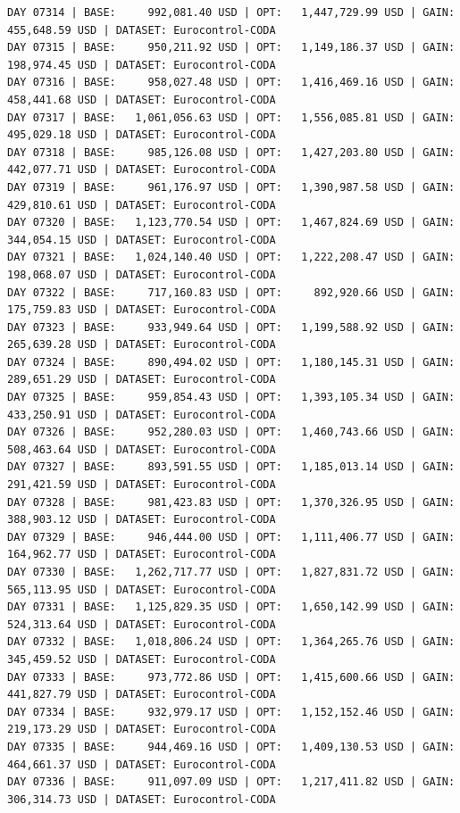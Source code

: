 \documentclass[11pt,a4paper]{article}
\begin{document}
\begin{verbatim}
DAY 07314 | BASE:     992,081.40 USD | OPT:   1,447,729.99 USD | GAIN: 455,648.59 USD | DATASET: Eurocontrol-CODA
DAY 07315 | BASE:     950,211.92 USD | OPT:   1,149,186.37 USD | GAIN: 198,974.45 USD | DATASET: Eurocontrol-CODA
DAY 07316 | BASE:     958,027.48 USD | OPT:   1,416,469.16 USD | GAIN: 458,441.68 USD | DATASET: Eurocontrol-CODA
DAY 07317 | BASE:   1,061,056.63 USD | OPT:   1,556,085.81 USD | GAIN: 495,029.18 USD | DATASET: Eurocontrol-CODA
DAY 07318 | BASE:     985,126.08 USD | OPT:   1,427,203.80 USD | GAIN: 442,077.71 USD | DATASET: Eurocontrol-CODA
DAY 07319 | BASE:     961,176.97 USD | OPT:   1,390,987.58 USD | GAIN: 429,810.61 USD | DATASET: Eurocontrol-CODA
DAY 07320 | BASE:   1,123,770.54 USD | OPT:   1,467,824.69 USD | GAIN: 344,054.15 USD | DATASET: Eurocontrol-CODA
DAY 07321 | BASE:   1,024,140.40 USD | OPT:   1,222,208.47 USD | GAIN: 198,068.07 USD | DATASET: Eurocontrol-CODA
DAY 07322 | BASE:     717,160.83 USD | OPT:     892,920.66 USD | GAIN: 175,759.83 USD | DATASET: Eurocontrol-CODA
DAY 07323 | BASE:     933,949.64 USD | OPT:   1,199,588.92 USD | GAIN: 265,639.28 USD | DATASET: Eurocontrol-CODA
DAY 07324 | BASE:     890,494.02 USD | OPT:   1,180,145.31 USD | GAIN: 289,651.29 USD | DATASET: Eurocontrol-CODA
DAY 07325 | BASE:     959,854.43 USD | OPT:   1,393,105.34 USD | GAIN: 433,250.91 USD | DATASET: Eurocontrol-CODA
DAY 07326 | BASE:     952,280.03 USD | OPT:   1,460,743.66 USD | GAIN: 508,463.64 USD | DATASET: Eurocontrol-CODA
DAY 07327 | BASE:     893,591.55 USD | OPT:   1,185,013.14 USD | GAIN: 291,421.59 USD | DATASET: Eurocontrol-CODA
DAY 07328 | BASE:     981,423.83 USD | OPT:   1,370,326.95 USD | GAIN: 388,903.12 USD | DATASET: Eurocontrol-CODA
DAY 07329 | BASE:     946,444.00 USD | OPT:   1,111,406.77 USD | GAIN: 164,962.77 USD | DATASET: Eurocontrol-CODA
DAY 07330 | BASE:   1,262,717.77 USD | OPT:   1,827,831.72 USD | GAIN: 565,113.95 USD | DATASET: Eurocontrol-CODA
DAY 07331 | BASE:   1,125,829.35 USD | OPT:   1,650,142.99 USD | GAIN: 524,313.64 USD | DATASET: Eurocontrol-CODA
DAY 07332 | BASE:   1,018,806.24 USD | OPT:   1,364,265.76 USD | GAIN: 345,459.52 USD | DATASET: Eurocontrol-CODA
DAY 07333 | BASE:     973,772.86 USD | OPT:   1,415,600.66 USD | GAIN: 441,827.79 USD | DATASET: Eurocontrol-CODA
DAY 07334 | BASE:     932,979.17 USD | OPT:   1,152,152.46 USD | GAIN: 219,173.29 USD | DATASET: Eurocontrol-CODA
DAY 07335 | BASE:     944,469.16 USD | OPT:   1,409,130.53 USD | GAIN: 464,661.37 USD | DATASET: Eurocontrol-CODA
DAY 07336 | BASE:     911,097.09 USD | OPT:   1,217,411.82 USD | GAIN: 306,314.73 USD | DATASET: Eurocontrol-CODA

\end{verbatim}
\end{document}
